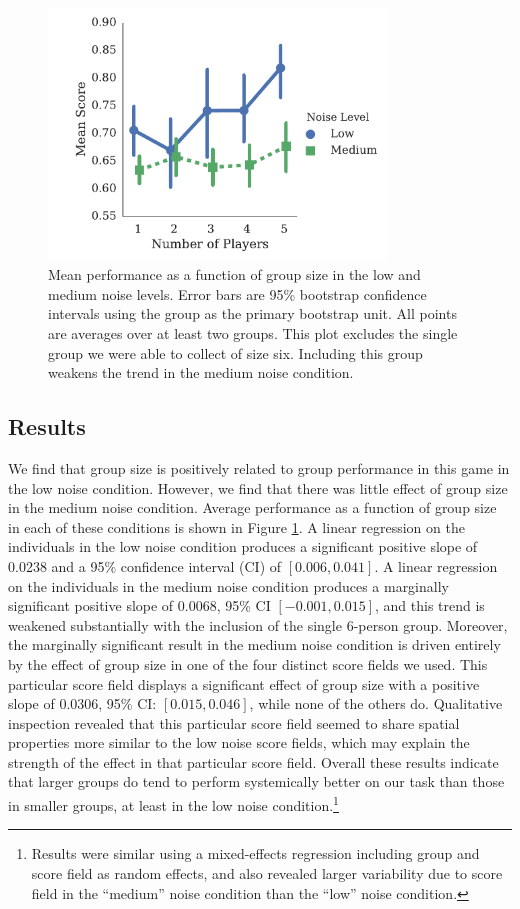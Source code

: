 \documentclass[12pt,letterpaper]{article}
\begin{document}
\begin{figure}[t]
  \centering
  \includegraphics[width=0.8\textwidth]{./figures/performance-summary}
  \caption{Mean performance as a function of group size in the low and
    medium noise levels.  Error bars are 95\% bootstrap confidence
    intervals using the group as the primary bootstrap unit.  All
    points are averages over at least two groups.  This plot excludes
    the single group we were able to collect of size six.  Including
    this group weakens the trend in the medium noise condition.}
  \label{fig:performance}
\end{figure}

\subsection{Results}

We find that group size is positively related to group performance in
this game in the low noise condition.  However, we find that there was
little effect of group size in the medium noise condition.  Average
performance as a function of group size in each of these conditions is
shown in Figure \ref{fig:performance}.  A linear regression on the
individuals in the low noise condition produces a significant positive
slope of 0.0238 and a 95\% confidence interval (CI) of
$[0.006,0.041]$.  A linear regression on the individuals in the medium
noise condition produces a marginally significant positive slope of
$0.0068$, 95\% CI $[-0.001,0.015]$, and this trend is weakened
substantially with the inclusion of the single 6-person group.
Moreover, the marginally significant result in the medium noise
condition is driven entirely by the effect of group size in one of the
four distinct score fields we used.  This particular score field
displays a significant effect of group size with a positive slope of
0.0306, 95\% CI: $[0.015,0.046]$, while none of the others do.
Qualitative inspection revealed that this particular score field
seemed to share spatial properties more similar to the low noise score
fields, which may explain the strength of the effect in that
particular score field.  Overall these results indicate that larger
groups do tend to perform systemically better on our task than those
in smaller groups, at least in the low noise
condition.\footnote{Results were similar using a mixed-effects
  regression including group and score field as random effects, and
  also revealed larger variability due to score field in the
  ``medium'' noise condition than the ``low'' noise condition.}
\end{document}
